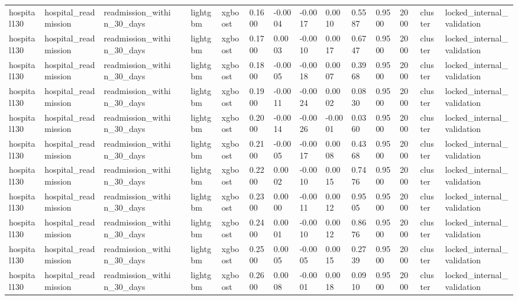 \begin{tabular}{lllllllllllllll}
hospital130 & hospital\_readmission & readmission\_within\_30\_days &  & lightgbm & xgboost & 0.1600 & -0.0004 & -0.0017 & 0.0010 & 0.5587 & 0.9500 & 2000 & cluster & locked\_internal\_validation \\
hospital130 & hospital\_readmission & readmission\_within\_30\_days &  & lightgbm & xgboost & 0.1700 & 0.0003 & -0.0010 & 0.0017 & 0.6747 & 0.9500 & 2000 & cluster & locked\_internal\_validation \\
hospital130 & hospital\_readmission & readmission\_within\_30\_days &  & lightgbm & xgboost & 0.1800 & -0.0005 & -0.0018 & 0.0007 & 0.3968 & 0.9500 & 2000 & cluster & locked\_internal\_validation \\
hospital130 & hospital\_readmission & readmission\_within\_30\_days &  & lightgbm & xgboost & 0.1900 & -0.0011 & -0.0024 & 0.0002 & 0.0830 & 0.9500 & 2000 & cluster & locked\_internal\_validation \\
hospital130 & hospital\_readmission & readmission\_within\_30\_days &  & lightgbm & xgboost & 0.2000 & -0.0014 & -0.0026 & -0.0001 & 0.0360 & 0.9500 & 2000 & cluster & locked\_internal\_validation \\
hospital130 & hospital\_readmission & readmission\_within\_30\_days &  & lightgbm & xgboost & 0.2100 & -0.0005 & -0.0017 & 0.0008 & 0.4368 & 0.9500 & 2000 & cluster & locked\_internal\_validation \\
hospital130 & hospital\_readmission & readmission\_within\_30\_days &  & lightgbm & xgboost & 0.2200 & 0.0002 & -0.0010 & 0.0015 & 0.7476 & 0.9500 & 2000 & cluster & locked\_internal\_validation \\
hospital130 & hospital\_readmission & readmission\_within\_30\_days &  & lightgbm & xgboost & 0.2300 & 0.0000 & -0.0011 & 0.0012 & 0.9505 & 0.9500 & 2000 & cluster & locked\_internal\_validation \\
hospital130 & hospital\_readmission & readmission\_within\_30\_days &  & lightgbm & xgboost & 0.2400 & 0.0001 & -0.0010 & 0.0012 & 0.8676 & 0.9500 & 2000 & cluster & locked\_internal\_validation \\
hospital130 & hospital\_readmission & readmission\_within\_30\_days &  & lightgbm & xgboost & 0.2500 & 0.0005 & -0.0005 & 0.0015 & 0.2739 & 0.9500 & 2000 & cluster & locked\_internal\_validation \\
hospital130 & hospital\_readmission & readmission\_within\_30\_days &  & lightgbm & xgboost & 0.2600 & 0.0008 & -0.0001 & 0.0018 & 0.0910 & 0.9500 & 2000 & cluster & locked\_internal\_validation \\

\end{tabular}
